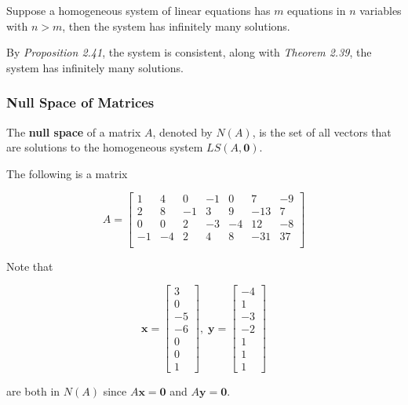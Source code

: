 \documentclass[a4paper,12pt]{article}
\begin{document}
\begin{thm}
  Suppose a homogeneous system of linear equations has $m$ equations in $n$ variables with $n>m$, then the system has infinitely many solutions.\n

  \prf By {\color{zr}\textit{Proposition 2.41}}, the system is consistent, along with {\color{zr}\textit{Theorem 2.39}}, the system has infinitely many solutions.
\end{thm}

\subsubsection{Null Space of Matrices}
\begin{dft}
  The \textbf{null space} of a matrix $A$, denoted by $N(A)$, is the set of all vectors that are solutions to the homogeneous system $LS(A,\mathbf{0})$.
\end{dft}\n

\begin{exm}
  The following is a matrix

  $$A=\begin{bmatrix}
  1 & 4 & 0 & -1 & 0 & 7 & -9\\
  2 & 8 & -1 & 3 & 9 & -13 & 7\\
  0 & 0 & 2 & -3 & -4 & 12 & -8\\
  -1 & -4 & 2 & 4 & 8 & -31 & 37\\
  \end{bmatrix}$$\s

  Note that

  $$\mathbf{x}=\begin{bmatrix}
  3\\
  0\\
  -5\\
  -6\\
  0\\
  0\\
  1
\end{bmatrix},\;\mathbf{y}=\begin{bmatrix}
  -4\\
  1\\
  -3\\
  -2\\
  1\\
  1\\
  1
  \end{bmatrix}$$\s

  are both in $N(A)$ since $A\mathbf{x}=\mathbf{0}$ and $A\mathbf{y}=\mathbf{0}$.
\end{exm}
\end{document}
